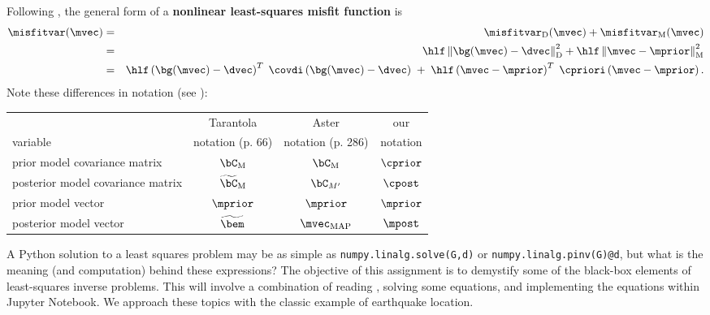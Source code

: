 \documentclass[11pt,titlepage,fleqn]{article}
\begin{document}
Following \citet[][p.~205]{Tarantola2005}, the general form of a {\bf nonlinear least-squares misfit function} is
%
\begin{eqnarray}
\misfitvar(\mvec) &=& \misfitvar_{\rm D}(\mvec) + \misfitvar_{\rm M}(\mvec) 
\\
&=& \hlf \left\| \bg(\mvec) - \dvec \right\|^2_{\rm D} + \hlf \left\| \mvec - \mprior \right\|^2_{\rm M}
\\
&=& \hlf \left( \bg(\mvec) - \dvec\right)^T \; \covdi \left( \bg(\mvec) - \dvec \right)
\;+\; \hlf \left( \mvec - \mprior \right)^T \; \cpriori \left( \mvec - \mprior \right).
\nonumber \\
\end{eqnarray}
%
Note these differences in notation (see ):

\vspace{0.2cm}
\begin{tabular}{l|c|c|c}
\hline
                                    & Tarantola         & Aster    & our \\ 
variable                            & notation (p. 66) & notation (p. 286)  & notation \\ \hline
prior model covariance matrix       & $\bC_{\rm M}$                & $\bC_{\rm M}$    & $\cprior$    \\ \hline
posterior model covariance matrix   & $\widetilde{\bC}_{\rm M}$    & $\bC_{M'}$      & $\cpost$     \\ \hline
prior model vector                  & $\mprior$                  & $\mprior$      & $\mprior$     \\ \hline
posterior model vector              & $\widetilde{\bem}$         & $\mvec_{\rm MAP}$ & $\mpost$     \\ \hline
\hline
\end{tabular}
\vspace{0.2cm}

\nocite{Aster}

\medskip\noindent
A Python solution to a least squares problem may be as simple as \verb+numpy.linalg.solve(G,d)+ or \verb+numpy.linalg.pinv(G)@d+, but what is the meaning (and computation) behind these expressions? The objective of this assignment is to demystify some of the black-box elements of least-squares inverse problems. This will involve a combination of reading \citet{Tarantola2005}, solving some equations, and implementing the equations within Jupyter Notebook. We approach these topics with the classic example of earthquake location.
\end{document}
